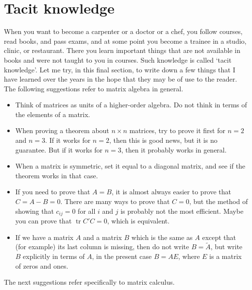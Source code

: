 \documentclass[12pt,a4paper]{article}
\theoremstyle{definition}
\DeclareMathOperator{\tr}{tr}
\begin{document}
\section{Tacit knowledge}\label{sec:16}

When you want to become a carpenter or a doctor or a chef, you follow courses, read books, and pass exams, and at some point you become a trainee in a studio, clinic, or restaurant. There you learn important things that are not available in books and were not taught to you in courses. Such knowledge is called `tacit knowledge'. Let me try, in this final section, to write down a few things that I have learned over the years in the hope that they may be of use to the reader. The following suggestions refer to matrix algebra in general. %

\begin{itemize}
\item Think of matrices as units of a higher-order algebra. Do not think in terms of the elements of a matrix. %
\item When proving a theorem about $n \times n$ matrices, try to prove it first for $n = 2$ and $n = 3$. If it works for $n = 2$, then this is good news, but it is no guarantee. But if it works for $n = 3$, then it probably works in general. %
\item When a matrix is symmetric, set it equal to a diagonal matrix, and see if the theorem works in that case. %
\item If you need to prove that $A = B$, it is almost always easier to prove that $C = A - B = 0$. There are many ways to prove that $C = 0$, but the method of showing that $c_{ij} = 0$ for all $i$ and $j$ is probably not the most efficient. Maybe you can prove that $\tr C'C = 0$, which is equivalent. %
\item If we have a matrix $A$ and a matrix $B$ which is the same as $A$ except that (for example) its last column is missing, then do not write $B = \tilde{A}$, but write $B$ explicitly in terms of $A$, in the present case $B = AE$, where $E$ is a matrix of zeros and ones. %
\end{itemize}

The next suggestions refer specifically to matrix calculus.
\end{document}
